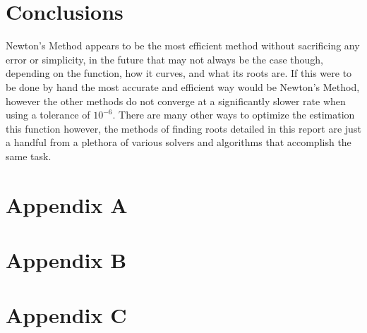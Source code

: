 \documentclass[12pt, letterpaper]{article}
\begin{document}
\section{Conclusions}
	Newton's Method appears to be the most efficient method without sacrificing any error or simplicity, in the future that may not always be the case though, depending on the function, how it curves, and what its roots are. If this were to be done by hand the most accurate and efficient way would be Newton's Method, however the other methods do not converge at a significantly slower rate when using a tolerance of $10^{-6}$. There are many other ways to optimize the estimation this function however, the methods of finding roots detailed in this report are just a handful from a plethora of various solvers and algorithms that accomplish the same task. 

\pagebreak
	
\appendix
	\section{Appendix A}
	\pagebreak

	\section{Appendix B}
		

	\clearpage
	
	\section{Appendix C}
\end{document}
